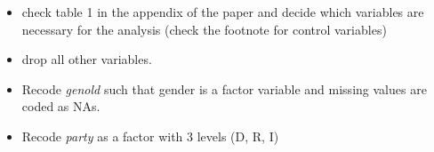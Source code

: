 \documentclass[
]{article}
\newenvironment{Shaded}{\begin{snugshade}}{\end{snugshade}}
\newcommand{\KeywordTok}[1]{\textcolor[rgb]{0.13,0.29,0.53}{\textbf{#1}}}
\newcommand{\NormalTok}[1]{#1}
\newcommand{\OperatorTok}[1]{\textcolor[rgb]{0.81,0.36,0.00}{\textbf{#1}}}
\newcommand{\StringTok}[1]{\textcolor[rgb]{0.31,0.60,0.02}{#1}}
\providecommand{\tightlist}{%
  \setlength{\itemsep}{0pt}\setlength{\parskip}{0pt}}
\begin{document}
\begin{itemize}
\tightlist
\item
  check table 1 in the appendix of the paper and decide which variables
  are necessary for the analysis (check the footnote for control
  variables)
\item
  drop all other variables.
\end{itemize}

\begin{Shaded}
\end{Shaded}

\begin{itemize}
\tightlist
\item
  Recode \emph{genold} such that gender is a factor variable and missing
  values are coded as NAs.
\end{itemize}

\begin{Shaded}
\end{Shaded}

\begin{itemize}
\tightlist
\item
  Recode \emph{party} as a factor with 3 levels (D, R, I)
\end{itemize}

\begin{Shaded}
\end{Shaded}
\end{document}
